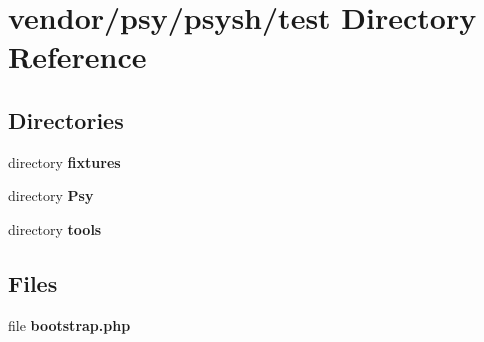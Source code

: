 \section{vendor/psy/psysh/test Directory Reference}
\label{dir_74639e712f3e21162211f32a45d64184}
\subsection*{Directories}
\begin{DoxyCompactItemize}
\item 
directory {\bf fixtures}
\item 
directory {\bf Psy}
\item 
directory {\bf tools}
\end{DoxyCompactItemize}
\subsection*{Files}
\begin{DoxyCompactItemize}
\item 
file {\bf bootstrap.\+php}
\end{DoxyCompactItemize}
